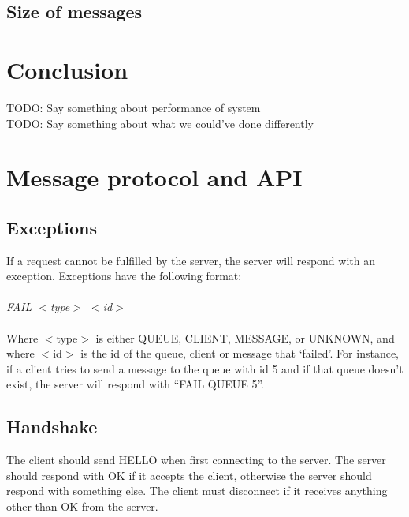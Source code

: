 \documentclass{article}
\begin{document}
        \subsection{Size of messages}

    \section{Conclusion}
        TODO: Say something about performance of system\\
        TODO: Say something about what we could've done differently
    \clearpage
    \appendix
        \section{Message protocol and API}
        \label{sec:message_protocol_api}
            \subsection{Exceptions}
                If a request cannot be fulfilled by the server, the server will respond with an exception.  Exceptions have the following format:\\
                \\
                \indent\textit{FAIL $<$type$>$ $<$id$>$}\\
                \\
                Where $<$type$>$ is either QUEUE, CLIENT, MESSAGE, or UNKNOWN, and where $<$id$>$ is the id of the queue, client or message that ‘failed’. For instance, if a client tries to send a message to the queue with id 5 and if that queue doesn’t exist, the server will respond with “FAIL QUEUE 5”.

            \subsection{Handshake}
                The client should send HELLO when first connecting to the server. The server should respond with OK if it accepts the client, otherwise the server should respond with something else. The client must disconnect if it receives anything other than OK from the server.
\end{document}
